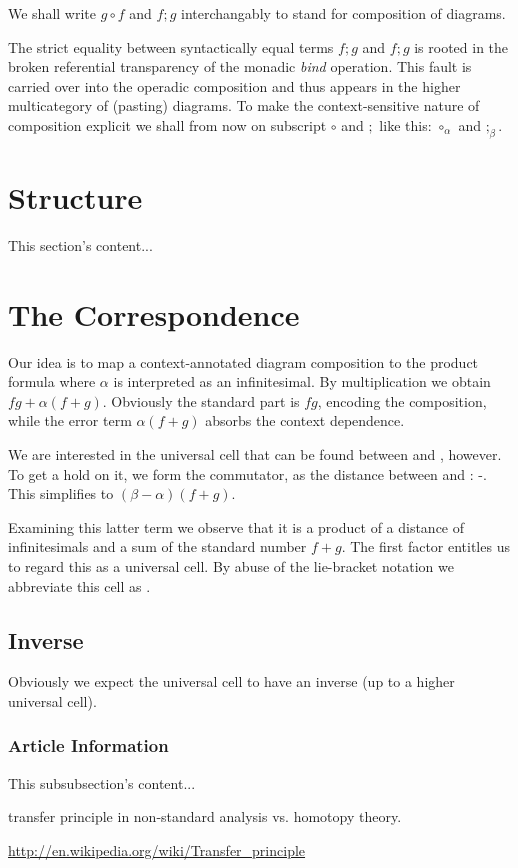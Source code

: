 \documentclass{article}
\begin{document}
We shall write $g \circ f$ and $f;g$ interchangably to stand for
composition of diagrams.

The strict equality between syntactically equal terms $f;g$ and $f;g$
is rooted in the broken referential transparency of the monadic
\emph{bind} operation. This fault is carried over into the operadic
composition and thus appears in the higher multicategory of (pasting)
diagrams. To make the context-sensitive nature of composition explicit
we shall from now on subscript $\circ$ and $;$ like this: ${\circ_\alpha}$
and ${;_\beta}$.

\section{Structure}
This section's content...

\section{The Correspondence}

Our idea is to map a context-annotated diagram composition 
to the product formula  where $\alpha$ is interpreted as
an infinitesimal. By multiplication we obtain $fg+\alpha(f+g)$. Obviously the
standard part is $fg$, encoding the composition, while the error term $\alpha(f+g)$
absorbs the context dependence.

We are interested in the universal cell that can be found between 
and , however. To get a hold on it, we form the commutator, as the
distance between  and :
-. This simplifies to $(\beta-\alpha)(f+g)$.

Examining this latter term we observe that it is a product of a distance of infinitesimals
and a sum of the standard number $f+g$. The first factor entitles us to regard this as a
universal cell. By abuse of the lie-bracket notation we abbreviate this cell as
.

\subsection{Inverse}

Obviously we expect the universal cell to have an inverse (up to a higher universal cell).



\subsubsection{Article Information}
This subsubsection's content...


transfer principle in non-standard analysis vs. homotopy theory.

\url{http://en.wikipedia.org/wiki/Transfer_principle}
\end{document}
